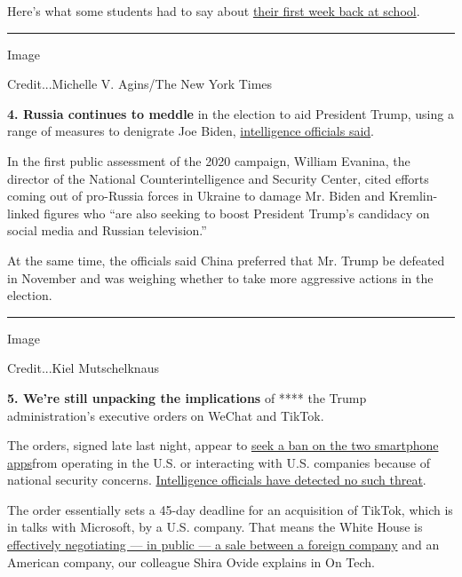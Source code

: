 Here's what some students had to say about
\href{https://www.nytimes3xbfgragh.onion/2020/08/06/us/coronavirus-students.html}{their
first week back at school}.

\begin{center}\rule{0.5\linewidth}{\linethickness}\end{center}

Image

Credit...Michelle V. Agins/The New York Times

\textbf{4. Russia continues to meddle} in the election to aid President
Trump, using a range of measures to denigrate Joe Biden,
\href{https://www.nytimes3xbfgragh.onion/2020/08/07/us/politics/russia-china-trump-biden-election-interference.html}{intelligence
officials said}.

In the first public assessment of the 2020 campaign, William Evanina,
the director of the National Counterintelligence and Security Center,
cited efforts coming out of pro-Russia forces in Ukraine to damage Mr.
Biden and Kremlin-linked figures who ``are also seeking to boost
President Trump's candidacy on social media and Russian television.''

At the same time, the officials said China preferred that Mr. Trump be
defeated in November and was weighing whether to take more aggressive
actions in the election.

\begin{center}\rule{0.5\linewidth}{\linethickness}\end{center}

Image

Credit...Kiel Mutschelknaus

\textbf{5. We're still unpacking the implications} of **** the Trump
administration's executive orders on WeChat and TikTok.

The orders, signed late last night, appear to
\href{https://www.nytimes3xbfgragh.onion/2020/08/06/technology/trump-wechat-tiktok-china.html}{seek
a ban on the two smartphone apps}from operating in the U.S. or
interacting with U.S. companies because of national security concerns.
\href{https://www.nytimes3xbfgragh.onion/2020/08/07/us/politics/tiktok-security-threat.html}{Intelligence
officials have detected no such threat}.

The order essentially sets a 45-day deadline for an acquisition of
TikTok, which is in talks with Microsoft, by a U.S. company. That means
the White House is
\href{https://www.nytimes3xbfgragh.onion/2020/08/07/technology/trump-tiktok-wechat.html}{effectively
negotiating --- in public --- a sale between a foreign company} and an
American company, our colleague Shira Ovide explains in On Tech.

